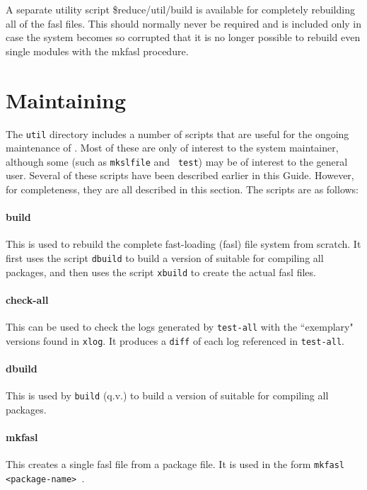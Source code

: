 A separate utility script \$reduce/util/build is available for completely
rebuilding all of the {\REDUCE} fasl files.  This should normally never be
required and is included only in case the system becomes so corrupted that
it is no longer possible to rebuild even single modules with the mkfasl
procedure.

\section{Maintaining {\REDUCE}}
The {\tt util} directory includes a number of scripts that are useful for
the ongoing maintenance of {\REDUCE}.  Most of these are only of interest
to the system maintainer, although some (such as {\tt mkslfile} and {\tt
test}) may be of interest to the general user.  Several of these scripts
have been described earlier in this Guide.  However, for completeness,
they are all described in this section.  The scripts are as follows:

\paragraph{build}

This is used to rebuild the complete {\REDUCE} fast-loading (fasl) file
system from scratch.  It first uses the script {\tt dbuild} to build a
version of {\REDUCE} suitable for compiling all packages, and then uses
the script {\tt xbuild} to create the actual fasl files.

\paragraph{check-all}

This can be used to check the logs generated by {\tt test-all} with the
``exemplary" versions found in {\tt xlog}.  It produces a {\tt diff} of
each log referenced in {\tt test-all}.

\paragraph{dbuild}

This is used by {\tt build} (q.v.) to build a version of {\REDUCE} suitable
for compiling all packages.

\paragraph{mkfasl}

This creates a single fasl file from a package file.  It is used in the
form {\tt  mkfasl <package-name> }.

